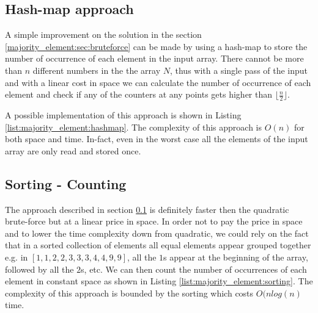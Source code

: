 


\subsection{Hash-map approach}
\label{majority_element:sec:hashmap}

A simple improvement on the solution in the section \ref{majority_element:sec:bruteforce} can be made by using a hash-map to store the number of occurrence of each element in the input array. There cannot be more than $n$ different numbers in the the array $N$, thus with a single pass of the input and with a linear cost in space we can calculate the number of occurrence of each element and check if any of the counters at any points gets higher than $\lfloor \frac{n}{2} \rfloor$.

A possible implementation of this approach is shown in Listing \ref{list:majority_element:hashmap}.
The complexity of this approach is $O(n)$ for both space and time. In-fact, even in the worst case  all the elements of the input array are only read and stored once.



\subsection{Sorting - Counting}
\label{majority_element:sec:sorting}
The approach described in section \ref{majority_element:sec:hashmap} is definitely faster then the quadratic brute-force but at a linear price in space. In order not to pay the price in space and to lower the time complexity down from quadratic, we could rely on the fact that in a sorted collection of elements all equal elements appear grouped together e.g. in $[1,1,2,2,3,3,3,4,4,9,9]$, all the $1$s appear at the beginning of the array, followed by all the $2$s, etc. We can then count the number of occurrences of each element in constant space as shown in Listing \ref{list:majority_element:sorting}. The complexity of this approach is bounded by the sorting which costs $O(nlog(n)$ time.



